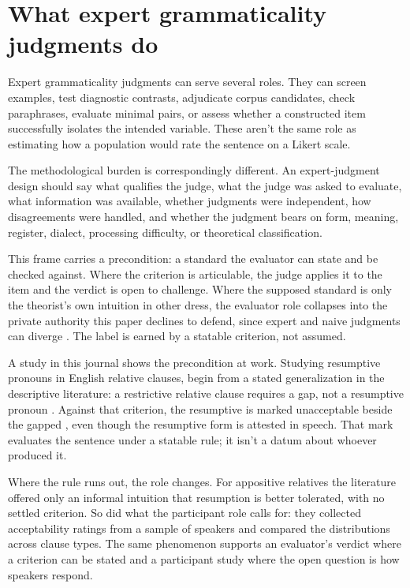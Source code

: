 \section{What expert grammaticality judgments do}
\label{sec:linguistic-judgment-work}

Expert grammaticality judgments can serve several roles. They can screen examples, test diagnostic contrasts, adjudicate corpus candidates, check paraphrases, evaluate minimal pairs, or assess whether a constructed item successfully isolates the intended variable. These aren't the same role as estimating how a population would rate the sentence on a Likert scale.

The methodological burden is correspondingly different. An expert-judgment design should say what qualifies the judge, what the judge was asked to evaluate, what information was available, whether judgments were independent, how disagreements were handled, and whether the judgment bears on form, meaning, register, dialect, processing difficulty, or theoretical classification.

This frame carries a precondition: a standard the evaluator can state and be checked against. Where the criterion is articulable, the judge applies it to the item and the verdict is open to challenge. Where the supposed standard is only the theorist's own intuition in other dress, the evaluator role collapses into the private authority this paper declines to defend, since expert and naive judgments can diverge \citep{dabrowska2010}. The label is earned by a statable criterion, not assumed.

A study in this journal shows the precondition at work. Studying resumptive pronouns in English relative clauses, \textcite{lossWicklund2020} begin from a stated generalization in the descriptive literature: a restrictive relative clause requires a gap, not a resumptive pronoun \citep[][1091]{huddleston2002}. Against that criterion, the resumptive  is marked unacceptable beside the gapped , even though the resumptive form is attested in speech. That mark evaluates the sentence under a statable rule; it isn't a datum about whoever produced it.

Where the rule runs out, the role changes. For appositive relatives the literature offered only an informal intuition that resumption is better tolerated, with no settled criterion. So \textcite{lossWicklund2020} did what the participant role calls for: they collected acceptability ratings from a sample of speakers and compared the distributions across clause types. The same phenomenon supports an evaluator's verdict where a criterion can be stated and a participant study where the open question is how speakers respond.

